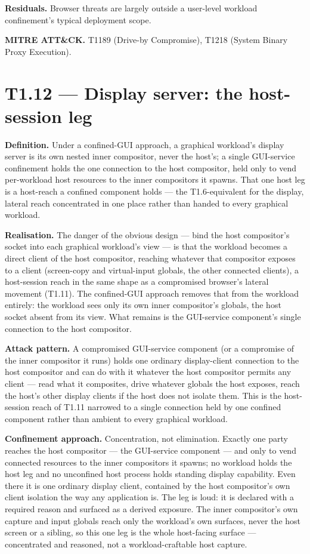 \textbf{Residuals.} Browser threats are largely outside a user-level
workload confinement's typical deployment scope.

\textbf{MITRE ATT\&CK.} T1189 (Drive-by Compromise), T1218 (System
Binary Proxy Execution).

\hypertarget{t1.12-display-server-the-host-session-leg}{%
\section{T1.12 --- Display server: the host-session
leg}\label{t1.12-display-server-the-host-session-leg}}

\textbf{Definition.} Under a confined-GUI approach, a graphical
workload's display server is its own nested inner compositor, never the
host's; a single GUI-service confinement holds the one connection to the
host compositor, held only to vend per-workload host resources to the
inner compositors it spawns. That one host leg is a host-reach a
confined component holds --- the T1.6-equivalent for the display,
lateral reach concentrated in one place rather than handed to every
graphical workload.

\textbf{Realisation.} The danger of the obvious design --- bind the host
compositor's socket into each graphical workload's view --- is that the
workload becomes a direct client of the host compositor, reaching
whatever that compositor exposes to a client (screen-copy and
virtual-input globals, the other connected clients), a host-session
reach in the same shape as a compromised browser's lateral movement
(T1.11). The confined-GUI approach removes that from the workload
entirely: the workload sees only its own inner compositor's globals, the
host socket absent from its view. What remains is the GUI-service
component's single connection to the host compositor.

\textbf{Attack pattern.} A compromised GUI-service component (or a
compromise of the inner compositor it runs) holds one ordinary
display-client connection to the host compositor and can do with it
whatever the host compositor permits any client --- read what it
composites, drive whatever globals the host exposes, reach the host's
other display clients if the host does not isolate them. This is the
host-session reach of T1.11 narrowed to a single connection held by one
confined component rather than ambient to every graphical workload.

\textbf{Confinement approach.} Concentration, not elimination. Exactly
one party reaches the host compositor --- the GUI-service component ---
and only to vend connected resources to the inner compositors it spawns;
no workload holds the host leg and no unconfined host process holds
standing display capability. Even there it is one ordinary display
client, contained by the host compositor's own client isolation the way
any application is. The leg is loud: it is declared with a required
reason and surfaced as a derived exposure. The inner compositor's own
capture and input globals reach only the workload's own surfaces, never
the host screen or a sibling, so this one leg is the whole host-facing
surface --- concentrated and reasoned, not a workload-craftable host
capture.


